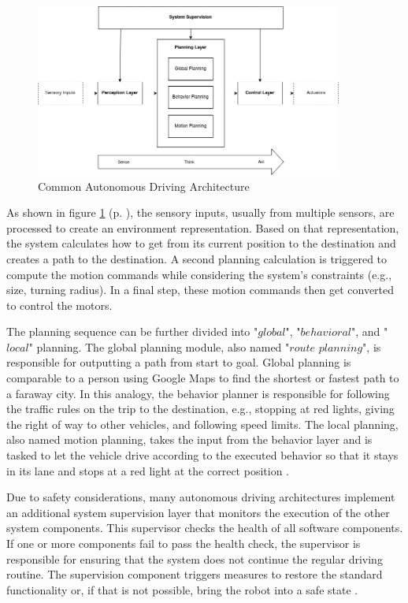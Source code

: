 \begin{figure}[ht]
	\centering
	\includegraphics[width=0.9\textwidth]{images/autonomous_driving_architecture.png}
	\caption{Common Autonomous Driving Architecture \cite{brooks1986,velasco2020}}
	\label{fig:autonomous_driving_architecture}
\end{figure}

As shown in figure \ref{fig:autonomous_driving_architecture} (p. \pageref{fig:autonomous_driving_architecture}), the sensory inputs, usually from multiple sensors, are processed to create an environment representation. Based on that representation, the system calculates how to get from its current position to the destination and creates a path to the destination. A second planning calculation is triggered to compute the motion commands while considering the system's constraints (e.g., size, turning radius). In a final step, these motion commands then get converted to control the motors. 

The planning sequence can be further divided into "$global$", "$behavioral$", and "$local$" planning. The global planning module, also named "$route$ $planning$", is responsible for outputting a path from start to goal. Global planning is comparable to a person using Google Maps to find the shortest or fastest path to a faraway city. In this analogy, the behavior planner is responsible for following the traffic rules on the trip to the destination, e.g., stopping at red lights, giving the right of way to other vehicles, and following speed limits. The local planning, also named motion planning, takes the input from the behavior layer and is tasked to let the vehicle drive according to the executed behavior so that it stays in its lane and stops at a red light at the correct position \cite{reke2020}.

Due to safety considerations, many autonomous driving architectures implement an additional system supervision layer that monitors the execution of the other system components. This supervisor checks the health of all software components. If one or more components fail to pass the health check, the supervisor is responsible for ensuring that the system does not continue the regular driving routine. The supervision component triggers measures to restore the standard functionality or, if that is not possible, bring the robot into a safe state \cite{zimmermann2020adaptive}.

